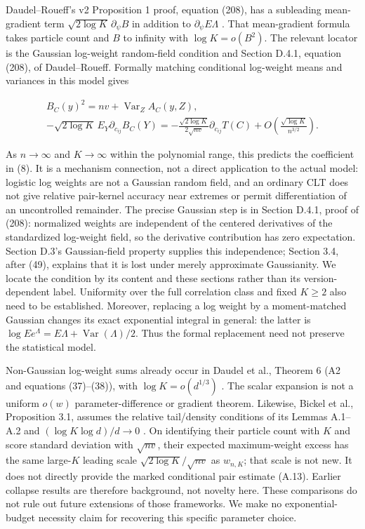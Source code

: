\documentclass{article}
\begin{document}
Daudel--Roueff's v2 Proposition 1 proof, equation (208), has a
subleading mean-gradient term \(\sqrt{2\log K}\,\partial_\psi B\) in
addition to \(\partial_\psi E\Lambda\) \citep{daudel2026}. That
mean-gradient formula takes particle count and \(B\) to infinity with
\(\log K=o(B^2)\). The relevant locator is the Gaussian log-weight
random-field condition and Section D.4.1, equation (208), of
Daudel--Roueff. Formally matching conditional log-weight means and
variances in this model gives

\[
\begin{gathered}
B_C(y)^2=nv+\operatorname{Var}_Z A_C(y,Z),\\
-\sqrt{2\log K}\,E_Y\partial_{c_{ij}}B_C(Y)
=-\frac{\sqrt{2\log K}}{2\sqrt{nv}}\partial_{c_{ij}}T(C)+O\!\left(\frac{\sqrt{\log K}}{n^{3/2}}\right).
\end{gathered}
\tag{B.3}
\]

As \(n\to\infty\) and \(K\to\infty\) within the polynomial range, this
predicts the coefficient in (8). It is a mechanism connection, not a
direct application to the actual model: logistic log weights are not a
Gaussian random field, and an ordinary CLT does not give relative
pair-kernel accuracy near extremes or permit differentiation of an
uncontrolled remainder. The precise Gaussian step is in Section D.4.1,
proof of (208): normalized weights are independent of the centered
derivatives of the standardized log-weight field, so the derivative
contribution has zero expectation. Section D.3's Gaussian-field property
supplies this independence; Section 3.4, after (49), explains that it is
lost under merely approximate Gaussianity. We locate the condition by
its content and these sections rather than its version-dependent label.
Uniformity over the full correlation class and fixed \(K\ge2\) also need
to be established. Moreover, replacing a log weight by a moment-matched
Gaussian changes its exact exponential integral in general: the latter
is \(\log E e^\Lambda=E\Lambda+\operatorname{Var}(\Lambda)/2\). Thus the
formal replacement need not preserve the statistical model.

Non-Gaussian log-weight sums already occur in Daudel et al., Theorem 6
(A2 and equations (37)--(38)), with \(\log K=o(d^{1/3})\)
\citep{daudel2023}. The scalar expansion is not a uniform \(o(w)\)
parameter-difference or gradient theorem. Likewise, Bickel et al.,
Proposition 3.1, assumes the relative tail/density conditions of its
Lemmas A.1--A.2 and \((\log K\log d)/d\to0\) \citep{bickel2008}. On
identifying their particle count with \(K\) and score standard deviation
with \(\sqrt{nv}\), their expected maximum-weight excess has the same
large-\(K\) leading scale \(\sqrt{2\log K}/\sqrt{nv}\) as \(w_{n,K}\);
that scale is not new. It does not directly provide the marked
conditional pair estimate (A.13). Earlier collapse results
\citep{bengtsson2008, snyder2008} are therefore background, not novelty
here. These comparisons do not rule out future extensions of those
frameworks. We make no exponential-budget necessity claim for recovering
this specific parameter choice.
\end{document}
